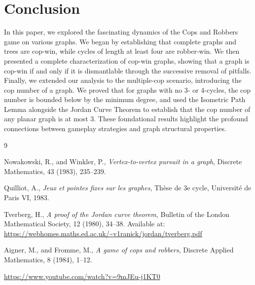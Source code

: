 \documentclass[12pt, a4paper]{article}
\begin{document}
\section{Conclusion}
In this paper, we explored the fascinating dynamics of the Cops and Robbers game on various graphs. We began by establishing that complete graphs and trees are cop-win, while cycles of length at least four are robber-win. We then presented a complete characterization of cop-win graphs, showing that a graph is cop-win if and only if it is dismantlable through the successive removal of pitfalls. Finally, we extended our analysis to the multiple-cop scenario, introducing the cop number of a graph. We proved that for graphs with no 3- or 4-cycles, the cop number is bounded below by the minimum degree, and used the Isometric Path Lemma alongside the Jordan Curve Theorem to establish that the cop number of any planar graph is at most 3. These foundational results highlight the profound connections between gameplay strategies and graph structural properties.


\newpage
\begin{thebibliography}{9}

Nowakowski, R., and Winkler, P., \textit{Vertex-to-vertex pursuit in a graph}, Discrete Mathematics, 43 (1983), 235--239.

Quilliot, A., \textit{Jeux et pointes fixes sur les graphes}, Th\`ese de 3e cycle, Universit\'e de Paris VI, 1983.

Tverberg, H., \textit{A proof of the Jordan curve theorem}, Bulletin of the London Mathematical Society, 12 (1980), 34--38.
Available at: \url{https://webhomes.maths.ed.ac.uk/~v1ranick/jordan/tverberg.pdf}

 
Aigner, M., and Fromme, M., \textit{A game of cops and robbers}, Discrete Applied Mathematics, 8 (1984), 1--12.

\url{https://www.youtube.com/watch?v=9mJEu-j1KT0}


\end{thebibliography}
\end{document}
